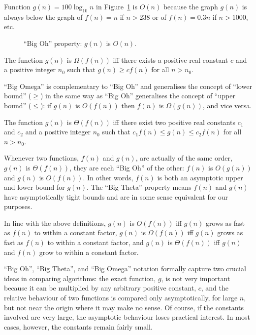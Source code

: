 \begin{Example}
Function \(g(n)=100\log_{10}n\) in Figure~\ref{f:aa-graphs} 
is \(O(n)\) because the graph \(g(n)\) is always below
the graph of \(f(n)=n\) if \(n > 238\) or of \(f(n)=0.3n\)
if \(n > 1000\), etc. 
\end{Example}

\begin{figure}[htb!]
\centerline{
}
\caption{``Big Oh'' property: $g(n)$ is $O(n)$.}
\label{f:aa-graphs}
\end{figure}
\begin{Definition} 
\label{def:omega}
The function $g(n)$ is $\Omega(f(n))$ iff 
there exists a positive real constant $c$ and a 
positive integer $n_{0}$  
such that $g(n) \ge c f(n)$ for all $n>n_{0}$.
\end{Definition} 

``Big Omega'' is complementary to ``Big Oh'' and generalises the
concept of ``lower bound'' (\(\ge\)) in the same way as ``Big Oh''
generalises the concept of ``upper bound'' (\(\le\)): if
\(g(n)\) is \(O(f(n))\) then \(f(n)\) is \(\Omega(g(n))\), and vice versa. 

\begin{Definition} 
\label{def:theta}
The function $g(n)$ is $\Theta(f(n))$ iff 
there exist two positive real constants $c_1$ and $c_2$ and a 
positive integer $n_{0}$  
such that $c_1f(n) \le g(n) \le c_2 f(n)$ for all $n>n_{0}$.
\end{Definition}

Whenever two functions, \(f(n)\) and \(g(n)\), are actually of the same
order, \(g(n)\) is \(\Theta(f(n))\), they are each ``Big Oh'' of the
other: $f(n)$ is $O(g(n))$ and $g(n)$ is  $O(f(n))$. In other words,
\(f(n)\) is both an asymptotic upper and lower bound for \(g(n)\). The
``Big Theta'' property means \(f(n)\) and \(g(n)\) have asymptotically
tight bounds and are in some sense equivalent for our purposes.

In line with the above definitions,
\(g(n)\) is \(O(f(n))\) iff \(g(n)\) grows  as fast as \(f(n)\) to within a constant factor, \(g(n)\) is
\(\Omega(f(n))\) iff \(g(n)\) grows  as fast as \(f(n)\) to within a constant factor, and
\(g(n)\) is \(\Theta(f(n))\) iff \(g(n)\) and \(f(n)\) grow
 to within a constant factor.


``Big Oh'', ``Big Theta'', and ``Big Omega'' notation formally capture 
two crucial ideas in comparing algorithms:
the exact function, $g$, is not very
important because it can be multiplied by any
arbitrary positive constant, $c$, and
the relative behaviour of two functions
is compared only asymptotically, for large $n$, but not near the
origin where it may make no sense.
Of course, if the constants involved are very large, 
the asymptotic behaviour loses practical interest. In most
cases, however, the constants remain fairly small. 

